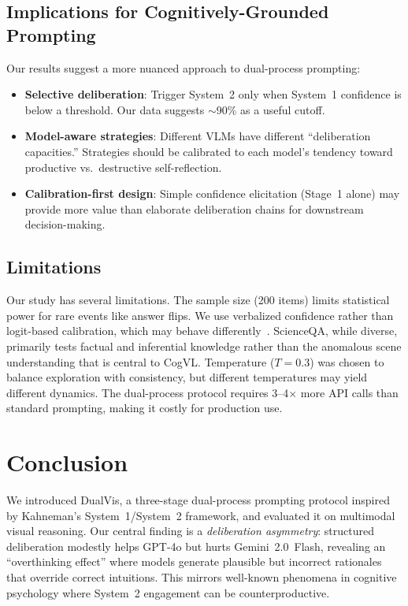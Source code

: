 \documentclass{cvpr}
\newcommand{\method}{DualVis}
\begin{document}
\subsection{Implications for Cognitively-Grounded Prompting}

Our results suggest a more nuanced approach to dual-process prompting:
\begin{itemize}
    \item \textbf{Selective deliberation}: Trigger System~2 only when System~1 confidence is below a threshold. Our data suggests $\sim$90\% as a useful cutoff.
    \item \textbf{Model-aware strategies}: Different VLMs have different ``deliberation capacities.'' Strategies should be calibrated to each model's tendency toward productive vs.\ destructive self-reflection.
    \item \textbf{Calibration-first design}: Simple confidence elicitation (Stage~1 alone) may provide more value than elaborate deliberation chains for downstream decision-making.
\end{itemize}

\subsection{Limitations}

Our study has several limitations. The sample size (200 items) limits statistical power for rare events like answer flips. We use verbalized confidence rather than logit-based calibration, which may behave differently~\cite{xiong2024can}. ScienceQA, while diverse, primarily tests factual and inferential knowledge rather than the anomalous scene understanding that is central to CogVL. Temperature ($T{=}0.3$) was chosen to balance exploration with consistency, but different temperatures may yield different dynamics. The dual-process protocol requires 3--4$\times$ more API calls than standard prompting, making it costly for production use.

\section{Conclusion}

We introduced \method{}, a three-stage dual-process prompting protocol inspired by Kahneman's System~1/System~2 framework, and evaluated it on multimodal visual reasoning. Our central finding is a \emph{deliberation asymmetry}: structured deliberation modestly helps GPT-4o but hurts Gemini~2.0~Flash, revealing an ``overthinking effect'' where models generate plausible but incorrect rationales that override correct intuitions. This mirrors well-known phenomena in cognitive psychology where System~2 engagement can be counterproductive.
\end{document}
